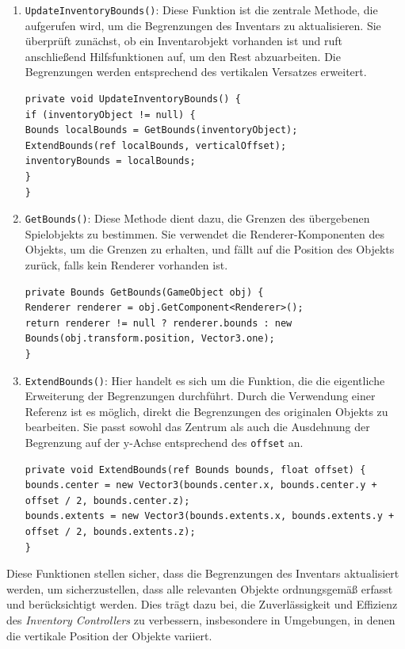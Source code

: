 \begin{enumerate}
\item \texttt{UpdateInventoryBounds()}: Diese Funktion ist die zentrale Methode, die aufgerufen wird, um die Begrenzungen
des Inventars zu aktualisieren. Sie überprüft zunächst, ob ein Inventarobjekt vorhanden ist und ruft anschließend
Hilfsfunktionen auf, um den Rest abzuarbeiten. Die Begrenzungen werden entsprechend des vertikalen Versatzes erweitert.
\begin{lstlisting}[language={[Sharp]C}]
private void UpdateInventoryBounds() {
if (inventoryObject != null) {
Bounds localBounds = GetBounds(inventoryObject);
ExtendBounds(ref localBounds, verticalOffset);
inventoryBounds = localBounds;
}
}
\end{lstlisting}

\item \texttt{GetBounds()}: Diese Methode dient dazu, die Grenzen des übergebenen Spielobjekts zu bestimmen. Sie verwendet
die Renderer-Komponenten des Objekts, um die Grenzen zu erhalten, und fällt auf die Position des Objekts zurück, falls
kein Renderer vorhanden ist.
\begin{lstlisting}[language={[Sharp]C}]
private Bounds GetBounds(GameObject obj) {
Renderer renderer = obj.GetComponent<Renderer>();
return renderer != null ? renderer.bounds : new Bounds(obj.transform.position, Vector3.one);
}
\end{lstlisting}

\item \texttt{ExtendBounds()}: Hier handelt es sich um die Funktion, die die eigentliche Erweiterung der Begrenzungen
durchführt. Durch die Verwendung einer Referenz ist es möglich, direkt die Begrenzungen des originalen Objekts zu
bearbeiten. Sie passt sowohl das Zentrum als auch die Ausdehnung der Begrenzung auf der y-Achse entsprechend des \texttt{offset} an.
\begin{lstlisting}[language={[Sharp]C}]
private void ExtendBounds(ref Bounds bounds, float offset) {
bounds.center = new Vector3(bounds.center.x, bounds.center.y + offset / 2, bounds.center.z);
bounds.extents = new Vector3(bounds.extents.x, bounds.extents.y + offset / 2, bounds.extents.z);
}
\end{lstlisting}
\end{enumerate}

Diese Funktionen stellen sicher, dass die Begrenzungen des Inventars aktualisiert werden, um sicherzustellen, dass alle
relevanten Objekte ordnungsgemäß erfasst und berücksichtigt werden. Dies trägt dazu bei, die Zuverlässigkeit und Effizienz
des \textit{Inventory Controllers} zu verbessern, insbesondere in Umgebungen, in denen die vertikale Position der Objekte
variiert.

